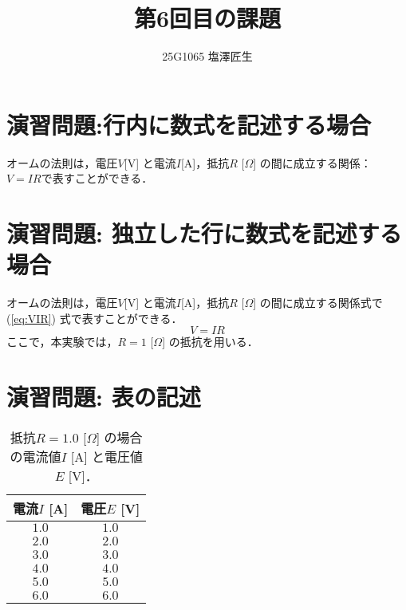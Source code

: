 \documentclass[uplatex]{jsarticle}
\title{第6回目の課題}
\author{25G1065 塩澤匠生}
\begin{document}
\maketitle

\section{演習問題:行内に数式を記述する場合}

オームの法則は，電圧$V$[V] と電流$I$[A]，抵抗$R$ [$\Omega$] の間に成立する関係： $V=IR$で表すことができる．

\section{演習問題: 独立した行に数式を記述する場合}

オームの法則は，電圧$V$[V] と電流$I$[A]，抵抗$R$ [$\Omega$] の間に成立する関係式で
(\ref{eq:VIR}) 式で表すことができる．\\
\begin{equation}
V=IR\label{eq:VIR}
\end{equation}
ここで，本実験では，$R=1$ [$\Omega$] の抵抗を用いる．

\section{演習問題: 表の記述}

\begin{table}[htb]
    \centering
    \caption{抵抗$R=1.0$ [$\Omega$] の場合の電流値$I$ [A] と電圧値$E$ [V]．}
    \label{table:EVR1}
    \begin{tabular}{cc}
        \hline
        電流$I$ [A] & 電圧$E$ [V]\\\hline\hline
        $1.0$ & $1.0$ \\\hline
        $2.0$ & $2.0$ \\\hline
        $3.0$ & $3.0$ \\\hline
        $4.0$ & $4.0$ \\\hline
        $5.0$ & $5.0$ \\\hline
        $6.0$ & $6.0$ \\\hline
        \end{tabular}
    \end{table}
\end{document}
